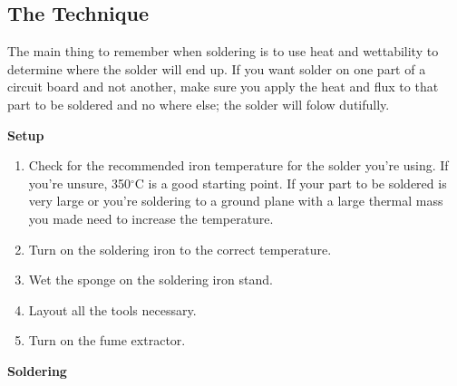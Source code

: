 \documentclass[]{book}
\providecommand{\tightlist}{%
  \setlength{\itemsep}{0pt}\setlength{\parskip}{0pt}}
\begin{document}
\hypertarget{the-technique}{%
\subsection{The Technique}\label{the-technique}}

The main thing to remember when soldering is to use heat and wettability to determine where the solder will end up. If you want solder on one part of a circuit board and not another, make sure you apply the heat and flux to that part to be soldered and no where else; the solder will folow dutifully.

\textbf{Setup}

\begin{enumerate}
\def\labelenumi{\arabic{enumi}.}
\tightlist
\item
  Check for the recommended iron temperature for the solder you're using. If you're unsure, 350\(^\circ\)C is a good starting point. If your part to be soldered is very large or you're soldering to a ground plane with a large thermal mass you made need to increase the temperature.
\item
  Turn on the soldering iron to the correct temperature.
\item
  Wet the sponge on the soldering iron stand.
\item
  Layout all the tools necessary.
\item
  Turn on the fume extractor.
\end{enumerate}

\textbf{Soldering}
\end{document}

